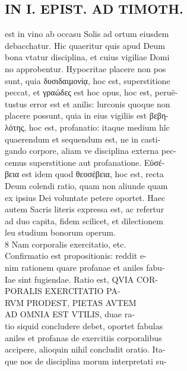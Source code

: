 \documentclass{article}
\begin{document}
\begin{pages}
\section*{IN I. EPIST. AD TIMOTH. \\
                }
est in vino ab occasu Solis ad ortum eiusdem \\
                debacchatur. Hic quaeritur quis apud Deum \\
                bona vtatur disciplina, et cuius vigiliae Domi \\
                no approbentur. Hypocritae placere non pos \\
                sunt, quia δυσιδαιμονίᾳ, hoc est, superstitione \\
                peccat, et γραώδες est hoc opus, hoc est, peruë- \\
                tustus error est et anilis: lurconis quoque non \\
                placere possunt, quia in eius vigiliis est βεβη- \\
                λότης, hoc est, profanatio: itaque medium hîc \\
                quaerendum et sequendum est, ne in casti- \\
                gando corpore, aliam ve disciplina externa pec- \\
                cemus superstitione aut profanatione. Εὐσέ- \\
                βεια est idem quod θεοσέβεια, hoc est, recta \\
                Deum colendi ratio, quam non aliunde quam \\
                ex ipsius Dei voluntate petere oportet. Haec \\
                autem Sacris literis expressa est, ac refertur \\
                ad duo capita, fidem scilicet, et dilectionem \\
                leu studium bonorum operum. \\
                8 Nam corporalis exercitatio, etc. \\
                Confirmatio est propositionis: reddit e- \\
                nim rationem quare profanae et aniles fabu- \\
                Iae sint fugiendae. Ratio est, QVIA COR- \\
                PORALIS EXERCITATIO PA- \\
                RVM PRODEST, PIETAS AVTEM \\
                AD OMNIA EST VTILIS, duae ra- \\
                tio siquid concludere debet, oportet fabulas \\
                aniles et profanas de exercitiis corporalibus \\
                accipere, alioquin nihil concludit oratio. Ita- \\
                que nos de disciplina morum interpretati su- \\
                

\end{pages}
\end{document}
